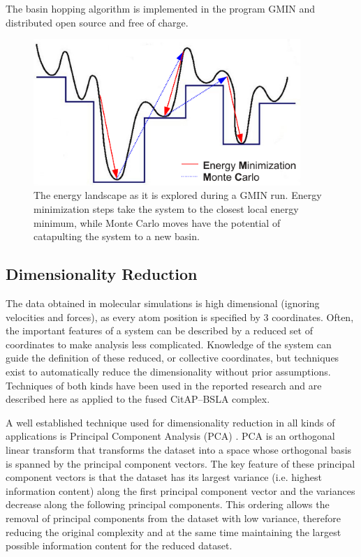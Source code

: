 \documentclass[english, a4paper, 12pt, titlepage, draft]{article}
\begin{document}
The basin hopping algorithm is implemented in the program GMIN \cite{GMIN} and distributed open source and free of charge.

\begin{figure}
    \centering
    \includegraphics[width=0.9\textwidth]{figures/GMIN.pdf}
    \caption{The energy landscape as it is explored during a GMIN run. Energy minimization steps take the system to the closest local energy minimum, while Monte Carlo moves have the potential of catapulting the system to a new basin.}
    \label{fig:GMIN}
\end{figure}        




\subsection{Dimensionality Reduction}

The data obtained in molecular simulations is high dimensional (ignoring velocities and forces), as every atom position is specified by 3 coordinates.
Often, the important features of a system can be described by a reduced set of coordinates to make analysis less complicated.
Knowledge of the system can guide the definition of these reduced, or collective coordinates, but techniques exist to automatically reduce the dimensionality without prior assumptions.
Techniques of both kinds have been used in the reported research and are described here as applied to the fused CitAP--BSLA complex.

A well established technique used for dimensionality reduction in all kinds of applications is Principal Component Analysis (PCA) \cite{PCAoriginal} \cite{PCA}.
PCA is an orthogonal linear transform that transforms the dataset into a space whose orthogonal basis is spanned by the principal component vectors.
The key feature of these principal component vectors is that the dataset has its largest variance (i.e. highest information content) along the first principal component vector and the variances decrease along the following principal components.
This ordering allows the removal of principal components from the dataset with low variance, therefore reducing the original complexity and at the same time maintaining the largest possible information content for the reduced dataset.
\end{document}
